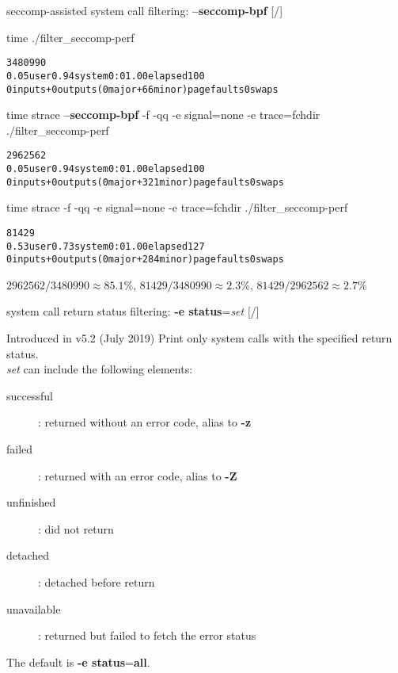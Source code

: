 \documentclass[unicode,aspectratio=169]{beamer}
\begin{document}
\begin{frame}[fragile]{seccomp-assisted system call filtering: \textbf{--seccomp-bpf} \hfill [\insertframenumber/\inserttotalframenumber]}
\begin{block}{time ./filter\_seccomp-perf}
\begin{alltt}
3480990
0.05user 0.94system 0:01.00elapsed 100%CPU (0avgtext+0avgdata 1324maxresident)k
0inputs+0outputs (0major+66minor)pagefaults 0swaps
\end{alltt}
\end{block}

\begin{block}{time strace \textbf{--seccomp-bpf} -f -qq -e signal=none -e trace=fchdir ./filter\_seccomp-perf}
\begin{alltt}
2962562
0.05user 0.94system 0:01.00elapsed 100%CPU (0avgtext+0avgdata 3280maxresident)k
0inputs+0outputs (0major+321minor)pagefaults 0swaps
\end{alltt}
\end{block}

\begin{block}{time strace -f -qq -e signal=none -e trace=fchdir ./filter\_seccomp-perf}
\begin{alltt}
81429
0.53user 0.73system 0:01.00elapsed 127%CPU (0avgtext+0avgdata 3156maxresident)k
0inputs+0outputs (0major+284minor)pagefaults 0swaps
\end{alltt}
\end{block}

$2962562 / 3480990 \approx 85.1\%$, $81429 / 3480990 \approx 2.3\%$, $81429 / 2962562 \approx 2.7\%$
\end{frame}

\begin{frame}{system call return status filtering: \textbf{-e status}=\textit{set} \hfill [\insertframenumber/\inserttotalframenumber]}
\Large
\begin{block}{Introduced in v5.2 (July 2019)}
Print only system calls with the specified return status. \\
\textit{set} can include the following elements:
\begin{description}
	\item[successful]: returned without an error code, alias to \textbf{-z}
	\item[failed]: returned with an error code, alias to \textbf{-Z}
	\item[unfinished]: did not return
	\item[detached]: detached before return
	\item[unavailable]: returned but failed to fetch the error status
\end{description}
\end{block}
The  default is \textbf{-e status}=\textbf{all}.
\end{frame}
\end{document}
